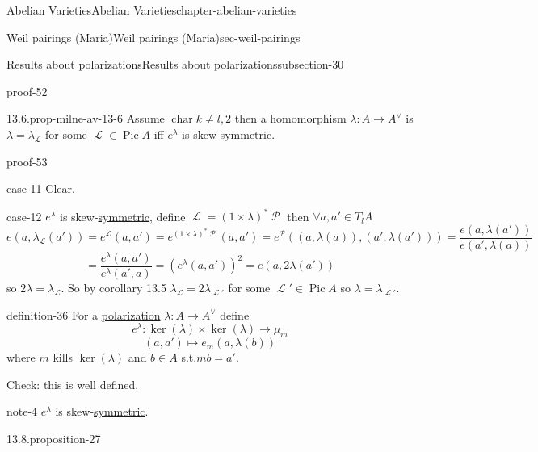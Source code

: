 \documentclass[oneside,10pt,]{book}
\numberwithin{equation}{section}
\newcommand{\sheaf}[1]{\operatorname{\mathcal{#1}}}
\DeclareMathOperator{\Pic}{Pic}
\DeclareMathOperator{\characteristic}{char}
\begin{document}
\begin{chapterptx}{Abelian Varieties}{}{Abelian Varieties}{}{}{chapter-abelian-varieties}
\begin{sectionptx}{Weil pairings (Maria)}{}{Weil pairings (Maria)}{}{}{sec-weil-pairings}
\begin{subsectionptx}{Results about polarizations}{}{Results about polarizations}{}{}{subsection-30}
\begin{proofptx}{}{proof-52}
%
\end{proofptx}
\begin{proposition}{13.6.}{}{prop-milne-av-13-6}%
\hypertarget{p-316}{}%
Assume \(\characteristic k \ne l,2\) then a homomorphism \(\lambda\colon A\to A^\vee\) is \(\lambda = \lambda_{\sheaf L}\) for some \(\sheaf L \in \Pic A\) iff \(e^\lambda\) is skew-\hyperref[def-princ-pol]{symmetric}.%
\end{proposition}
\begin{proofptx}{}{proof-53}
\begin{case}
{}{}{case-11}
\hypertarget{p-317}{}%
Clear.%
\end{case}
\begin{case}
{}{}{case-12}
\hypertarget{p-318}{}%
\(e^\lambda\) is skew-\hyperref[def-princ-pol]{symmetric}, define \(\sheaf L = (1 \times \lambda)^* \sheaf P\) then  \(\forall a,a' \in T_l A\)%
\begin{equation*}
e(a,\lambda_{\sheaf L} (a') ) = e^{\sheaf L}(a,a') = e^{(1\times \lambda)^* \sheaf P} (a,a') = e^{\sheaf P}((a,\lambda (a)), (a',\lambda(a'))) = \frac{e(a,\lambda (a'))}{ e(a',\lambda(a))}
\end{equation*}
%
\begin{equation*}
= \frac{e^\lambda(a,a')}{ e^\lambda(a',a)} = (e^\lambda(a,a'))^2 = e(a,2\lambda (a'))
\end{equation*}
so \(2\lambda = \lambda_{\sheaf L}\). So by corollary 13.5 \(\lambda_{\sheaf L} = 2\lambda_{\sheaf L'}\) for some \(\sheaf L' \in \Pic A\) so \(\lambda = \lambda_{\sheaf L'}\).%
\end{case}
\end{proofptx}
\begin{definition}{}{definition-36}%
\hypertarget{p-319}{}%
For a  \hyperref[def-c-pol]{polarization} \(\lambda \colon A\to A^\vee\) define%
\begin{equation*}
e^{\lambda} \colon \ker(\lambda)\times \ker(\lambda) \to \mu_m
\end{equation*}
%
\begin{equation*}
(a,a')\mapsto e_m(a,\lambda(b))
\end{equation*}
where \(m \) kills \(\ker(\lambda)\) and \(b \in A\) s.t.\(mb = a'\).%
\end{definition}
\hypertarget{p-320}{}%
Check: this is well defined.%
\begin{note}{}{note-4}%
\hypertarget{p-321}{}%
\(e^\lambda\) is skew-\hyperref[def-princ-pol]{symmetric}.%
\end{note}
\begin{proposition}{13.8.}{}{proposition-27}%

\end{proposition}
\end{subsectionptx}
\end{sectionptx}
\end{chapterptx}
\end{document}
